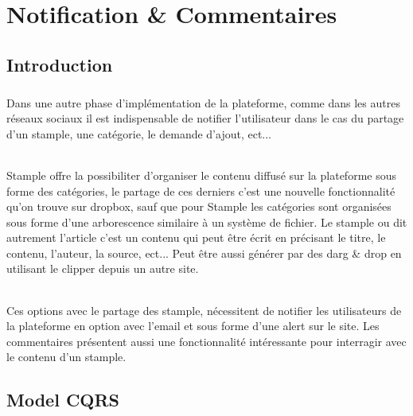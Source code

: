 \chapter{Notification \& Commentaires}
\section{Introduction}
\paragraph{}
Dans une autre phase d'implémentation de la plateforme, comme dans les autres réseaux sociaux il est indispensable de notifier l'utilisateur dans le cas du partage d'un stample, une catégorie, le demande d'ajout, ect...
\subparagraph{}
Stample offre la possibiliter d'organiser le contenu diffusé sur la plateforme sous forme des catégories, le partage de ces derniers c'est une nouvelle fonctionnalité qu'on trouve sur dropbox, sauf que pour Stample les catégories sont organisées sous forme d'une arborescence similaire à un système de fichier.
\newline
Le stample ou dit autrement l'article c'est un contenu qui peut être écrit en précisant le titre, le contenu, l'auteur, la source, ect...
Peut être aussi générer par des darg \& drop en utilisant le clipper depuis un autre site.
\subparagraph{}
Ces options avec le partage des stample, nécessitent de notifier les utilisateurs de la plateforme en option avec l'email et sous forme d'une alert sur le site.
\newline
Les commentaires présentent aussi une fonctionnalité intéressante pour interragir avec le contenu d'un stample.
\newpage
\section{Model CQRS}
